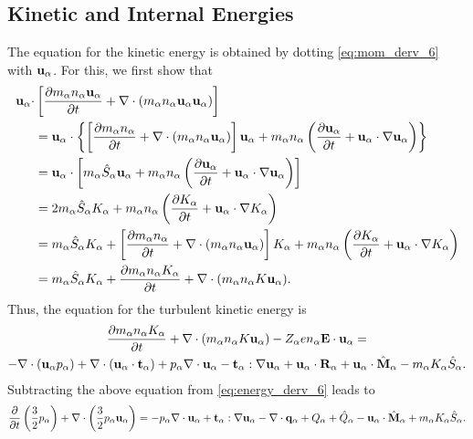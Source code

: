 \documentclass[oneside,a4paper,11pt]{report}
\begin{document}
\subsection{Kinetic and Internal Energies}
The equation for the kinetic energy is obtained by dotting \cref{eq:mom_derv_6} with $\mathbf{u}_\alpha$. For this, we first show that
\begin{align}
    \mathbf{u}_\alpha \cdot &\left [ \frac{\partial m_\alpha n_\alpha \mathbf{u}_\alpha}{\partial t} + \nabla \cdot \left ( m_\alpha n_\alpha \mathbf{u}_\alpha \mathbf{u}_\alpha \right) \right ] \\
    & =\mathbf{u}_\alpha \cdot \left \{ \left [ \frac{\partial m_\alpha n_\alpha }{\partial t} + \nabla \cdot \left ( m_\alpha n_\alpha \mathbf{u}_\alpha \right) \right] \mathbf{u}_\alpha  + m_\alpha n_\alpha \left ( \frac{\partial \mathbf{u}_\alpha}{\partial t} + \mathbf{u}_\alpha \cdot \nabla \mathbf{u}_\alpha \right ) \right \}\\
    & =\mathbf{u}_\alpha \cdot \left [ m_\alpha \hat{S}_\alpha \mathbf{u}_\alpha  + m_\alpha n_\alpha \left ( \frac{\partial \mathbf{u}_\alpha}{\partial t} + \mathbf{u}_\alpha \cdot \nabla \mathbf{u}_\alpha \right ) \right ] \\
    & =2m_\alpha \hat{S}_\alpha K_\alpha + m_\alpha n_\alpha \left ( \frac{\partial K_\alpha}{\partial t} + \mathbf{u}_\alpha \cdot \nabla K_\alpha \right) \\
    & =m_\alpha \hat{S}_\alpha K_\alpha + \left [ \frac{\partial m_\alpha n_\alpha}{\partial t} + \nabla \cdot \left (m_\alpha n_\alpha \mathbf{u}_\alpha \right ) \right] K_\alpha + m_\alpha n_\alpha \left ( \frac{\partial K_\alpha}{\partial t} + \mathbf{u}_\alpha \cdot \nabla K_\alpha \right) \\
    & =m_\alpha \hat{S}_\alpha K_\alpha + \frac{\partial m_\alpha n_\alpha K_\alpha}{\partial t} + \nabla \cdot ( m_\alpha n_\alpha K \mathbf{u}_\alpha ).
\end{align}
Thus, the equation for the turbulent kinetic energy is
\begin{multline}
\frac{\partial m_\alpha n_\alpha K_\alpha}{\partial t} + \nabla \cdot ( m_\alpha n_\alpha K \mathbf{u}_\alpha ) - Z_\alpha e n_\alpha \mathbf{E} \cdot \mathbf{u}_\alpha =\\
-\nabla \cdot ( \mathbf{u}_\alpha p_\alpha ) + \nabla \cdot (\mathbf{u}_\alpha \cdot \mathbf{t}_\alpha ) + p_\alpha \nabla \cdot \mathbf{u}_\alpha - \mathbf{t}_\alpha : \nabla \mathbf{u}_\alpha + \mathbf{u}_\alpha \cdot \mathbf{R}_\alpha + \mathbf{u}_\alpha \cdot \hat{\mathbf{M}}_\alpha - m_\alpha K_\alpha \hat{S}_\alpha .
\end{multline}
Subtracting the above equation from \cref{eq:energy_derv_6} leads to 
\begin{equation}
\frac{\partial}{\partial t} \left ( \frac{3}{2} p_\alpha \right ) + \nabla \cdot \left ( \frac{3}{2} p_\alpha \mathbf{u}_\alpha \right ) = -p_\alpha \nabla \cdot \mathbf{u}_\alpha + \mathbf{t}_\alpha : \nabla \mathbf{u}_\alpha - \nabla \cdot \mathbf{q}_\alpha + Q_{\alpha} + \hat{Q}_\alpha - \mathbf{u}_\alpha \cdot \hat{\mathbf{M}}_\alpha + m_\alpha K_\alpha \hat{S}_\alpha .
\end{equation}
\end{document}
